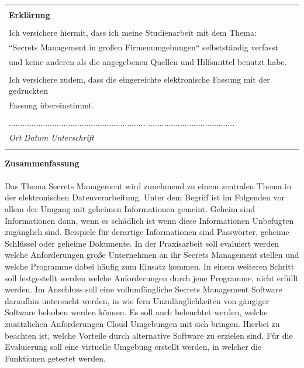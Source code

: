 \documentclass[
a4paper,   
titlepage,  
halfparskip,
12pt        
]{scrartcl}
\begin{document}
\thispagestyle{empty}

\begin{table}[h]
\centering
  \begin{tabular}{| l |}
  \hline
  \\
  \textbf{Erklärung} \\
  \\
  Ich versichere hiermit, dass ich meine Studienarbeit mit dem Thema: \\
  ``Secrets Management in großen Firmenumgebungen`` selbstständig verfasst \\
  und keine anderen als die angegebenen Quellen und Hilfsmittel benutzt habe. \\
  \\
  Ich versichere zudem, dass die eingereichte elektronische Fassung mit der gedruckten \\
  Fassung übereinstimmt. \\ \\
  ............................................................\hspace{0.5cm} ......................................\\
  \textit{Ort} \hspace{1cm} \textit{Datum} \hspace{4.2cm} \textit{Unterschrift}\\
  \\
  \hline
  \end{tabular}
\end{table}
\newpage

\thispagestyle{empty}

\large{\textbf{Zusammenfassung}}\\
\\
Das Thema Secrets Management wird zunehmend zu einem zentralen Thema in der
elektronischen Datenverarbeitung.  Unter dem Begriff ist im Folgenden vor
allem der Umgang mit geheimen Informationen gemeint.  Geheim sind
Informationen dann, wenn es schädlich ist wenn diese Informationen
Unbefugten zugänglich sind. Beispiele für derartige Informationen sind
Passwörter, geheime Schlüssel oder geheime Dokumente.  In der
Praxisarbeit soll evaluiert werden welche Anforderungen große Unternehmen
an ihr Secrets Management stellen und welche Programme dabei häufig zum
Einsatz kommen.  In einem weiteren Schritt soll festgestellt werden welche
Anforderungen durch jene Programme, nicht erfüllt werden.  Im Anschluss
soll eine vollumfängliche Secrets Management Software daraufhin untersucht
werden, in wie fern Unzulänglichkeiten von gängiger Software behoben
werden können.  Es soll auch beleuchtet werden, welche zusätzlichen
Anforderungen Cloud Umgebungen mit sich bringen.  Hierbei zu beachten ist,
welche Vorteile durch alternative Software zu erzielen sind.  Für die
Evaluierung soll eine virtuelle Umgebung erstellt werden, in welcher die
Funktionen getestet werden.
\newpage
\thispagestyle{empty}
\end{document}

